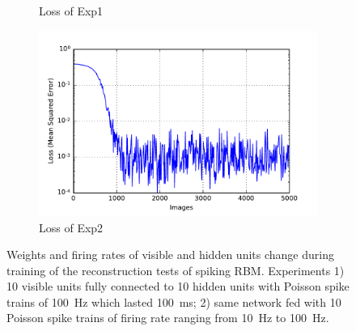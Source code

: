 \begin{figure}
\begin{subfigure}[t]{0.4\textwidth}
		\caption{Loss of Exp1}
	\end{subfigure}
	\begin{subfigure}[t]{0.4\textwidth}
		\includegraphics[width=\textwidth]{pics_sdlm/13_exp_SRBM_noise_long/exp2_mse_nons.pdf}
		\caption{Loss of Exp2}
	\end{subfigure}
	\caption{Weights and firing rates of visible and hidden units change during training of the reconstruction tests of spiking RBM. 
		Experiments 1) 10 visible units fully connected to 10 hidden units with Poisson spike trains of 100~Hz which lasted 100~ms; 2) same network fed with 10 Poisson spike trains of firing rate ranging from 10~Hz to 100~Hz.}
\end{figure}


